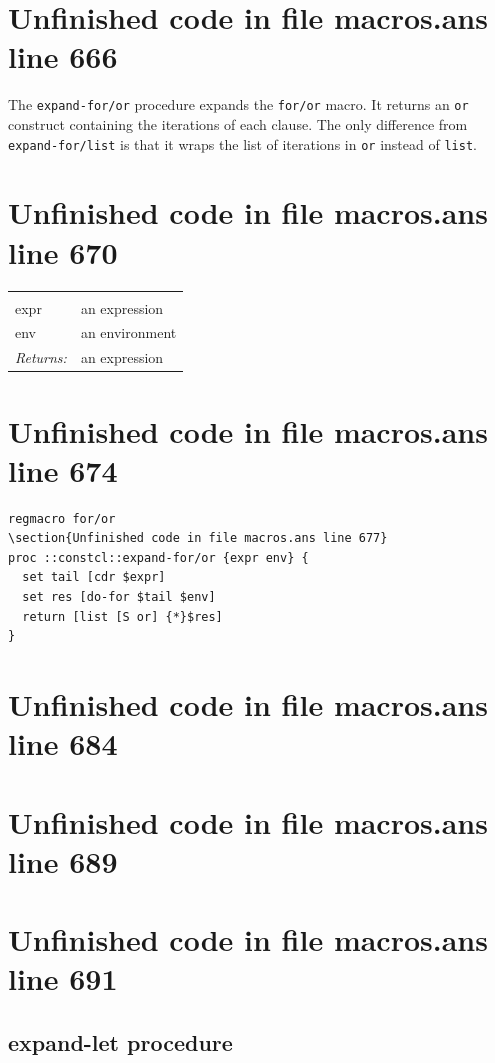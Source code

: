 \documentclass[twoside,9pt]{report}
\begin{document}
\section{Unfinished code in file macros.ans line 666}

The \texttt{expand-for/or} procedure expands the \texttt{for/or} macro. It returns an \texttt{or} construct containing the iterations of each clause. The only difference from \texttt{expand-for/list} is that it wraps the list of iterations in \texttt{or} instead of \texttt{list}.

\section{Unfinished code in file macros.ans line 670}
\noindent\begin{tabular}{ |p{1.9cm} p{8cm}| }
\hline
\rowcolor[HTML]{CCCCCC} \multicolumn{2}{|l|}{\bf expand-for/or (internal)} \\
expr & an expression \\
env & an environment \\
\textit{Returns:} & an expression \\
\hline
\end{tabular}
\section{Unfinished code in file macros.ans line 674}
\begin{lstlisting}
regmacro for/or
\section{Unfinished code in file macros.ans line 677}
proc ::constcl::expand-for/or {expr env} {
  set tail [cdr $expr]
  set res [do-for $tail $env]
  return [list [S or] {*}$res]
}
\end{lstlisting}
\section{Unfinished code in file macros.ans line 684}
\section{Unfinished code in file macros.ans line 689}
\section{Unfinished code in file macros.ans line 691}
\subsection{expand-let procedure}
\label{expand-let-procedure}
\end{document}
